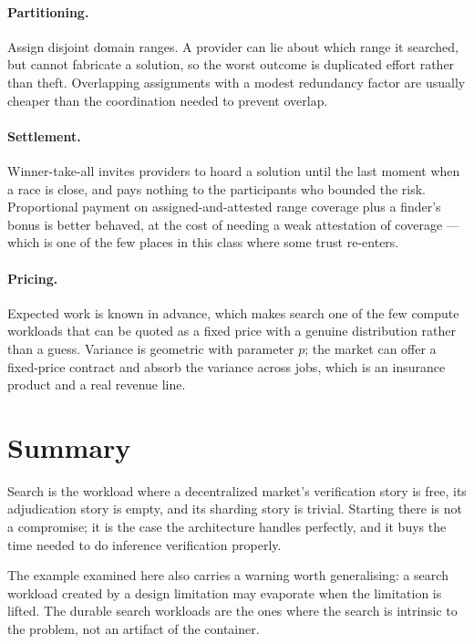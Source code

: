 \documentclass[11pt,a4paper]{article}
\begin{document}
\paragraph{Partitioning.} Assign disjoint domain ranges. A provider can lie about
which range it searched, but cannot fabricate a solution, so the worst outcome is
duplicated effort rather than theft. Overlapping assignments with a modest
redundancy factor are usually cheaper than the coordination needed to prevent
overlap.

\paragraph{Settlement.} Winner-take-all invites providers to hoard a solution
until the last moment when a race is close, and pays nothing to the participants
who bounded the risk. Proportional payment on assigned-and-attested range
coverage plus a finder's bonus is better behaved, at the cost of needing a weak
attestation of coverage --- which is one of the few places in this class where
some trust re-enters.

\paragraph{Pricing.} Expected work is known in advance, which makes search one of
the few compute workloads that can be quoted as a fixed price with a genuine
distribution rather than a guess. Variance is geometric with parameter $p$; the
market can offer a fixed-price contract and absorb the variance across jobs,
which is an insurance product and a real revenue line.

\section{Summary}

Search is the workload where a decentralized market's verification story is
free, its adjudication story is empty, and its sharding story is trivial.
Starting there is not a compromise; it is the case the architecture handles
perfectly, and it buys the time needed to do inference verification properly.

The example examined here also carries a warning worth generalising: a search
workload created by a design limitation may evaporate when the limitation is
lifted. The durable search workloads are the ones where the search is intrinsic
to the problem, not an artifact of the container.
\end{document}
